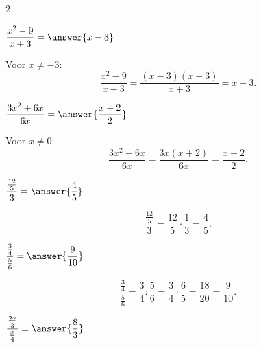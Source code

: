 \documentclass{ximera}
\begin{document}
\begin{oefening}{\oefB}
\begin{multicols}{2}
            
            \begin{question}
            $\dfrac{x^2-9}{x+3}
            =\answer{x-3}$
            
            \begin{oplossing}
            Voor $x\neq-3$:
            \[
            \dfrac{x^2-9}{x+3}
            =\dfrac{(x-3)(x+3)}{x+3}
            =x-3.
            \]
            \end{oplossing}
            \end{question}
            
            
            \begin{question}
            $\dfrac{3x^2+6x}{6x}
            =\answer{\dfrac{x+2}{2}}$
            
            \begin{oplossing}
            Voor $x\neq0$:
            \[
            \dfrac{3x^2+6x}{6x}
            =\dfrac{3x(x+2)}{6x}
            =\dfrac{x+2}{2}.
            \]
            \end{oplossing}
            \end{question}
            
            
            \begin{question}
            $\dfrac{\frac{12}{5}}{3}
            =\answer{\dfrac45}$
            
            \begin{oplossing}
            \[
            \dfrac{\frac{12}{5}}{3}
            =\dfrac{12}{5}\cdot\dfrac13
            =\dfrac45.
            \]
            \end{oplossing}
            \end{question}
            
            
            \begin{question}
            $\dfrac{\frac34}{\frac56}
            =\answer{\dfrac9{10}}$
            
            \begin{oplossing}
            \[
            \dfrac{\frac34}{\frac56}
            =\dfrac34:\dfrac56
            =\dfrac34\cdot\dfrac65
            =\dfrac{18}{20}
            =\dfrac9{10}.
            \]
            \end{oplossing}
            \end{question}
            
            
            \begin{question}
            $\dfrac{\frac{2x}{3}}{\frac{x}{4}}
            =\answer{\dfrac83}$
            

\end{question}
\end{multicols}
\end{oefening}
\end{document}
